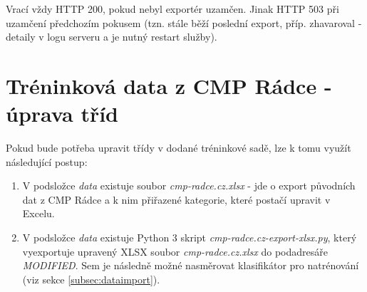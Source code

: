 \documentclass{article}
\begin{document}
Vrací vždy HTTP 200, pokud nebyl exportér uzamčen. Jinak HTTP 503 při uzamčení předchozím pokusem (tzn. stále běží poslední export, příp. zhavaroval - detaily v logu serveru a je nutný restart služby).


\appendix

\section{Tréninková data z CMP Rádce - úprava tříd}

Pokud bude potřeba upravit třídy v dodané tréninkové sadě, lze k tomu využít následující postup:

\begin{enumerate}
	\item V podsložce \textit{data} existuje soubor \textit{cmp-radce.cz.xlsx} - jde o export původních dat z CMP Rádce a k nim přiřazené kategorie, které postačí upravit v Excelu.
	\item V podsložce \textit{data} existuje Python 3 skript \textit{cmp-radce.cz-export-xlsx.py}, který vyexportuje upravený XLSX soubor \textit{cmp-radce.cz.xlsx} do podadresáře \textit{MODIFIED}. Sem je následně možné nasměrovat klasifikátor pro natrénování (viz sekce \ref{subsec:dataimport}).
\end{enumerate}
\end{document}
